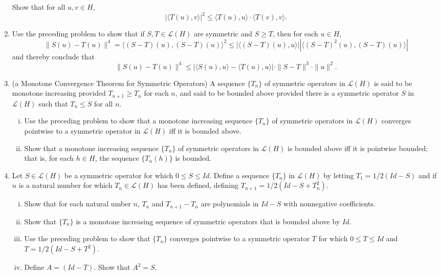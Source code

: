 \begin{enumerate}
    Show that for all $u,v\in H$,
    \[
        |\langle T(u),v\rangle|^2\le\langle T(u),u\rangle\cdot\langle T(v),v\rangle.
    \] 
    \item Use the preceding problem to show that if $S,T\in\mathcal{L}(H)$ are symmetric and $S\ge T$, then for each $u\in H$,
    \[
        \|S(u)-T(u)\|^4=\langle (S-T)(u),(S-T)(u)\rangle^2\le|\langle(S-T)(u),u\rangle||\langle(S-T)^2(u),(S-T)(u)\rangle|
    \]
    and thereby conclude that
    \[
        \|S(u)-T(u)\|^4\le|\langle S(u),u\rangle-\langle T(u),u\rangle|\cdot\|S-T\|^3\cdot\|u\|^2.
    \]
    \item (a Monotone Convergence Theorem for Symmetric Operators) A sequence $\{T_n\}$ of symmetric operators in $\mathcal{L}(H)$ is said to be monotone increasing provided $T_{n+1}\ge T_n$ for each $n$, and said to be bounded above provided there is a symmetric operator $S$ in $\mathcal{L}(H)$ such that $T_n\le S$ for all $n$.
    \begin{enumerate}[(i)]
        \item Use the preceding problem to show that a monotone increasing sequence $\{T_n\}$ of symmetric operators in $\mathcal{L}(H)$ converges pointwise to a symmetric operator in $\mathcal{L}(H)$ iff it is bounded above.
        \item Show that a monotone increasing sequence $\{T_n\}$ of symmetric operators in $\mathcal{L}(H)$ is bounded above iff it is pointwise bounded; that is, for each $h\in H$, the sequence $\{T_n(h)\}$ is bounded.
    \end{enumerate}
    \item Let $S\in\mathcal{L}(H)$ be a symmetric operator for which $0\le S\le Id$.
    Define a sequence $\{T_n\}$ in $\mathcal{L}(H)$ by letting $T_1=1/2(Id-S)$ and if $n$ is a natural number for which $T_n\in\mathcal{L}(H)$ has been defined, defining $T_{n+1}=1/2(Id-S+T_n^2)$.
    \begin{enumerate}[(i)]
        \item Show that for each natural umber $n$, $T_n$ and $T_{n+1}-T_n$ are polynomials in $Id-S$ with nonnegative coefficients.
        \item Show that $\{T_n\}$ is a monotone increasing sequence of symmetric operators that is bounded above by $Id$.
        \item Use the preceding problem to show that $\{T_n\}$ converges pointwise to a symmetric operator $T$ for which $0\le T\le Id$ and $T=1/2(Id-S+T^2)$.
        \item Define $A=(Id-T)$. Show that $A^2=S$.

\end{enumerate}
\end{enumerate}
